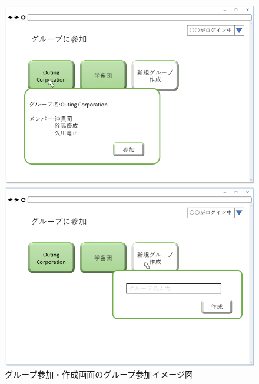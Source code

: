 \begin{figure}[htbp]
 \begin{minipage}{0.5\hsize}
  \begin{center}
   \includegraphics[width=1\linewidth,clip]{./img/26.png}
  \end{center}

 \end{minipage}
 \begin{minipage}{0.5\hsize}
  \begin{center}
   \includegraphics[width=1\linewidth,clip]{./img/27.png}
  \end{center}
 \end{minipage}
 \caption{グループ参加・作成画面のグループ参加イメージ図}\label{fig:26}
\end{figure}

